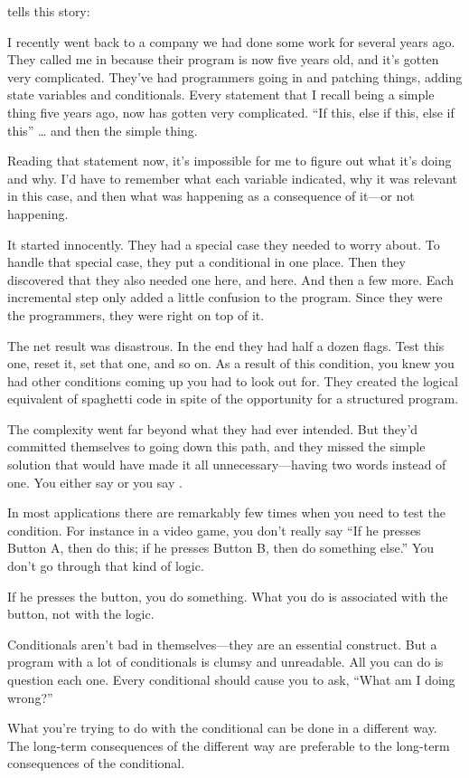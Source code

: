 \begin{interview}
 tells this story:
\begin{tfquot}
I recently went back to a company we had done some work for several years
ago. They called me in because their program is now five years old, and it's
gotten very complicated. They've had programmers going in and patching
things, adding state variables and conditionals. Every statement that I
recall being a simple thing five years ago, now has gotten very complicated.
``If this, else if this, else if this'' \dots{} and then the simple thing.

Reading that statement now, it's impossible for me to figure out what it's
doing and why. I'd have to remember what each variable indicated, why it
was relevant in this case, and then what was happening as a consequence of
it---or not happening.

It started innocently. They had a special case they needed to worry about.
To handle that special case, they put a conditional in one place. Then they
discovered that they also needed one here, and here. And then a few more.
Each incremental step only added a little confusion to the program. Since
they were the programmers, they were right on top of it.

The net result was disastrous. In the end they had half a dozen flags. Test
this one, reset it, set that one, and so on. As a result of this condition, you
knew you had other conditions coming up you had to look out for. They
created the logical equivalent of spaghetti code in spite of the opportunity
for a structured program.

The complexity went far beyond what they had ever intended. But they'd
committed themselves to going down this path, and they missed the simple
solution that would have made it all unnecessary---having two words
instead of one. You either say  or you say .

In most applications there are remarkably few times when you need to test
the condition. For instance in a video game, you don't really say ``If he
presses Button A, then do this; if he presses Button B, then do something
else.'' You don't go through that kind of logic.

If he presses the button, you do something. What you do is associated with
the button, not with the logic.

Conditionals aren't bad in themselves---they are an essential construct. But
a program with a lot of conditionals is clumsy and unreadable. All you can
do is question each one. Every conditional should cause you to ask, ``What
am I doing wrong?''

What you're trying to do with the conditional can be done in a different
way. The long-term consequences of the different way are preferable to the
long-term consequences of the conditional.
\end{tfquot}
\end{interview}%
